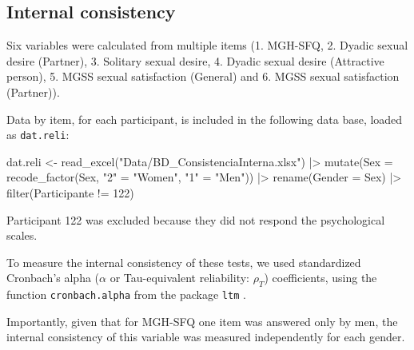 \documentclass[
  bookmarksnumbered]{article}
\newenvironment{Shaded}{\begin{snugshade}}{\end{snugshade}}
\newcommand{\AttributeTok}[1]{\textcolor[rgb]{0.80,0.80,0.80}{#1}}
\newcommand{\DecValTok}[1]{\textcolor[rgb]{0.86,0.86,0.80}{#1}}
\newcommand{\FunctionTok}[1]{\textcolor[rgb]{0.94,0.94,0.56}{#1}}
\newcommand{\NormalTok}[1]{\textcolor[rgb]{0.80,0.80,0.80}{#1}}
\newcommand{\OtherTok}[1]{\textcolor[rgb]{0.94,0.94,0.56}{#1}}
\newcommand{\SpecialCharTok}[1]{\textcolor[rgb]{0.86,0.64,0.64}{#1}}
\newcommand{\StringTok}[1]{\textcolor[rgb]{0.80,0.58,0.58}{#1}}
\begin{document}
\subsection{Internal consistency}\label{internal-consistency}

Six variables were calculated from multiple items (1. MGH-SFQ, 2. Dyadic sexual desire (Partner), 3. Solitary sexual desire, 4. Dyadic sexual desire (Attractive person), 5. MGSS sexual satisfaction (General) and 6. MGSS sexual satisfaction (Partner)).

Data by item, for each participant, is included in the following data base, loaded as \texttt{dat.reli}:

\begin{Shaded}
\begin{Highlighting}[]
\NormalTok{dat.reli }\OtherTok{\textless{}{-}} \FunctionTok{read\_excel}\NormalTok{(}\StringTok{"Data/BD\_ConsistenciaInterna.xlsx"}\NormalTok{)  }\SpecialCharTok{|\textgreater{}}  
  \FunctionTok{mutate}\NormalTok{(}\AttributeTok{Sex =} \FunctionTok{recode\_factor}\NormalTok{(Sex,}
                             \StringTok{"2"} \OtherTok{=} \StringTok{"Women"}\NormalTok{,}
                             \StringTok{"1"} \OtherTok{=} \StringTok{"Men"}\NormalTok{)) }\SpecialCharTok{|\textgreater{}} 
  \FunctionTok{rename}\NormalTok{(}\AttributeTok{Gender =}\NormalTok{ Sex) }\SpecialCharTok{|\textgreater{}} 
  \FunctionTok{filter}\NormalTok{(Participante }\SpecialCharTok{!=} \DecValTok{122}\NormalTok{)}
\end{Highlighting}
\end{Shaded}

Participant 122 was excluded because they did not respond the psychological scales.

To measure the internal consistency of these tests, we used standardized Cronbach's alpha (\(\alpha\) or Tau-equivalent reliability: \(\rho_{T}\)) coefficients, using the function \texttt{cronbach.alpha} from the package \texttt{ltm} \autocite{LtmPackageLatent2006}.

Importantly, given that for MGH-SFQ one item was answered only by men, the internal consistency of this variable was measured independently for each gender.
\end{document}

